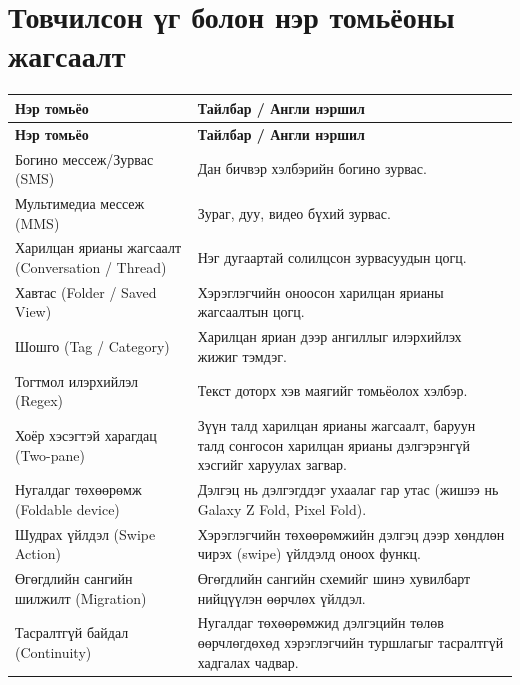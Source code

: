 \chapter*{Товчилсон үг болон нэр томьёоны жагсаалт}

\begin{longtable}{p{} p{}}
    \textbf{Нэр томьёо} & \textbf{Тайлбар / Англи нэршил} \\
    \hline
    \endfirsthead
    \hline
    \textbf{Нэр томьёо} & \textbf{Тайлбар / Англи нэршил} \\
    \hline
    \endhead

    Богино мессеж/Зурвас (SMS) & Дан бичвэр хэлбэрийн богино зурвас. \\
    Мультимедиа мессеж (MMS) & Зураг, дуу, видео бүхий зурвас. \\
    Харилцан ярианы жагсаалт (Conversation / Thread) & Нэг дугаартай солилцсон зурвасуудын цогц. \\
    Хавтас (Folder / Saved View) & Хэрэглэгчийн оноосон харилцан ярианы жагсаалтын цогц. \\
    Шошго (Tag / Category) & Харилцан яриан дээр ангиллыг илэрхийлэх жижиг тэмдэг. \\
    Тогтмол илэрхийлэл (Regex) & Текст доторх хэв маягийг томьёолох хэлбэр. \\
    Хоёр хэсэгтэй харагдац (Two-pane) & Зүүн талд харилцан ярианы жагсаалт, баруун талд сонгосон харилцан ярианы дэлгэрэнгүй хэсгийг харуулах загвар. \\
    Нугалдаг төхөөрөмж (Foldable device) & Дэлгэц нь дэлгэгддэг ухаалаг гар утас (жишээ нь Galaxy Z Fold, Pixel Fold). \\
    Шудрах үйлдэл (Swipe Action) & Хэрэглэгчийн төхөөрөмжийн дэлгэц дээр хөндлөн чирэх (swipe) үйлдэлд оноох функц. \\
    Өгөгдлийн сангийн шилжилт (Migration) & Өгөгдлийн сангийн схемийг шинэ хувилбарт нийцүүлэн өөрчлөх үйлдэл. \\
    Тасралтгүй байдал (Continuity) & Нугалдаг төхөөрөмжид дэлгэцийн төлөв өөрчлөгдөхөд хэрэглэгчийн туршлагыг тасралтгүй хадгалах чадвар. \\
    \hline
\end{longtable}
